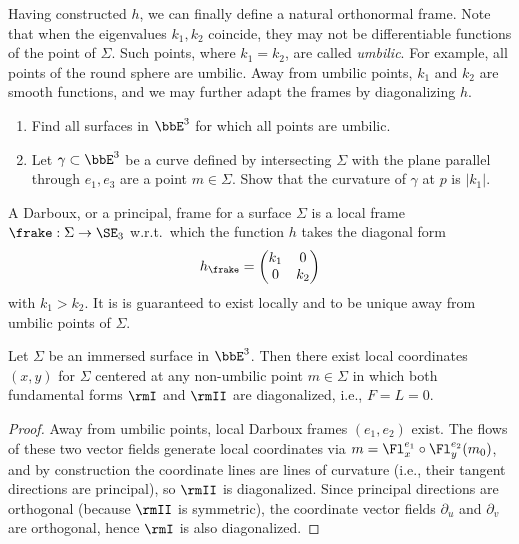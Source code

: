 Having constructed $h$, we can finally define a natural orthonormal frame. Note that when the eigenvalues $k_1,k_2$ coincide, they may not be differentiable functions of the point of $\Sigma$. Such points, where $k_1=k_2$, are called \emph{umbilic}. For example, all points of the round sphere are umbilic. Away from umbilic points, $k_1$ and $k_2$ are smooth functions, and we may further adapt the frames by diagonalizing $h$. 

\begin{xca}
    \begin{enumerate}
        \item Find all surfaces in $\bbE^3$ for which all points are umbilic.
        \item Let $\gamma\subset\bbE^3$ be a curve defined by intersecting $\Sigma$ with the plane parallel through $e_1,e_3$ are a point $m\in\Sigma$. Show that the curvature of $\gamma$ at $p$ is $|k_1|$.
    \end{enumerate}
\end{xca}


\begin{defn}
    A Darboux, or a principal, frame for a surface $\Sigma$ is a local frame $\frake:\Sigma\to \SE_3$ w.r.t.\ which the function $h$ takes the diagonal form 
    \[h_\frake=\begin{pmatrix}
        k_1&0\\
        0& k_2
    \end{pmatrix}\]
    with $k_1>k_2$. It is is guaranteed to exist locally and to be unique away from umbilic points of $\Sigma$.
\end{defn}

\begin{lem}\label{lem line of curvature coordinates}
    Let $\Sigma$ be an immersed surface in $\bbE^3$. Then there exist local coordinates $(x,y)$ for $\Sigma$ centered at any non-umbilic point $m\in\Sigma$ in which both fundamental forms $\rmI$ and $\rmII$ are diagonalized, i.e., $F=L=0$. 
\end{lem}
\begin{proof}
    Away from umbilic points, local Darboux frames $(e_1,e_2)$ exist. The flows of these two vector fields generate local coordinates via $m=\Fl^{e_1}_x\circ \Fl^{e_2}_y(m_0)$, and by construction the coordinate lines are lines of curvature (i.e., their tangent directions are principal), so $\rmII$ is diagonalized. Since principal directions are orthogonal (because $\rmII$ is symmetric), the coordinate vector fields $\partial_u$ and $\partial_v$ are orthogonal, hence $\rmI$ is also diagonalized.
\end{proof}


